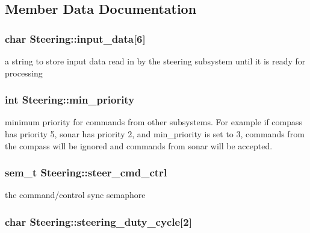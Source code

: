 \subsection{Member Data Documentation}
\hypertarget{classSteering_a8372fdfcf95f814d8e6a77f10b1116fe}{
\subsubsection[{input\-\_\-data}]{\setlength{\rightskip}{0pt plus 5cm}char Steering\-::input\-\_\-data\mbox{[}6\mbox{]}\hspace{0.3cm}{\ttfamily [protected]}}}\label{classSteering_a8372fdfcf95f814d8e6a77f10b1116fe}
a string to store input data read in by the steering subsystem until it is ready for processing \hypertarget{classSteering_ab31761e4665bf81e580f1bc32c9fff79}{
\subsubsection[{min\-\_\-priority}]{\setlength{\rightskip}{0pt plus 5cm}int Steering\-::min\-\_\-priority\hspace{0.3cm}{\ttfamily [protected]}}}\label{classSteering_ab31761e4665bf81e580f1bc32c9fff79}
minimum priority for commands from other subsystems. For example if compass has priority 5, sonar has priority 2, and min\-\_\-priority is set to 3, commands from the compass will be ignored and commands from sonar will be accepted. \hypertarget{classSteering_af9a4f30e9dc0dc37b31a421cb88ca8ba}{
\subsubsection[{steer\-\_\-cmd\-\_\-ctrl}]{\setlength{\rightskip}{0pt plus 5cm}sem\-\_\-t Steering\-::steer\-\_\-cmd\-\_\-ctrl\hspace{0.3cm}{\ttfamily [protected]}}}\label{classSteering_af9a4f30e9dc0dc37b31a421cb88ca8ba}
the command/control sync semaphore \hypertarget{classSteering_a3eb0bda8706c97d35c0ae31daeefa5a1}{
\subsubsection[{steering\-\_\-duty\-\_\-cycle}]{\setlength{\rightskip}{0pt plus 5cm}char Steering\-::steering\-\_\-duty\-\_\-cycle\mbox{[}2\mbox{]}\hspace{0.3cm}{\ttfamily [protected]}}}\label{classSteering_a3eb0bda8706c97d35c0ae31daeefa5a1}
